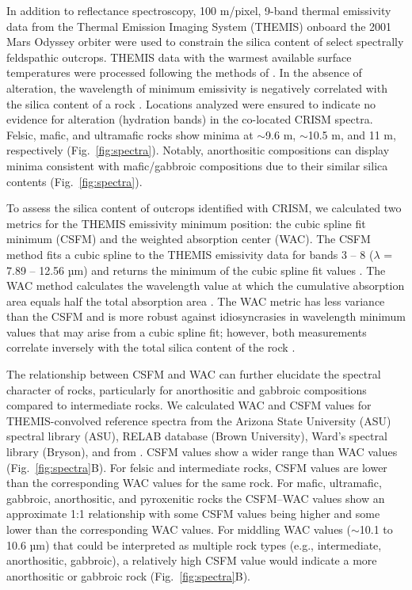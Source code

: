 \documentclass[12pt]{article}
\begin{document}
In addition to reflectance spectroscopy, 100 m/pixel, 9-band thermal emissivity data from the Thermal Emission Imaging System (THEMIS) onboard the 2001 Mars Odyssey orbiter \citep{Christensen2004} were used to constrain the silica content of select spectrally feldspathic outcrops. THEMIS data with the warmest available surface temperatures were processed following the methods of \citet{Bandfield2004}. In the absence of alteration, the wavelength of minimum emissivity is negatively correlated with the silica content of a rock \citep{Lyon1965}. Locations analyzed were ensured to indicate no evidence for alteration (hydration bands) in the co-located CRISM spectra. Felsic, mafic, and ultramafic rocks show minima at $\sim$9.6 \textmu m, $\sim$10.5 \textmu m, and 11 \textmu m, respectively (Fig.~\ref{fig:spectra}). Notably, anorthositic compositions can display minima consistent with mafic/gabbroic compositions due to their similar silica contents (Fig.~\ref{fig:spectra}).

To assess the silica content of outcrops identified with CRISM, we calculated two metrics for the THEMIS emissivity minimum position: the cubic spline fit minimum (CSFM) and the weighted absorption center (WAC). The CSFM method fits a cubic spline to the THEMIS emissivity data for bands 3 -- 8 ($\lambda$ = 7.89 -- 12.56 µm) and returns the minimum of the cubic spline fit values \citep{Rogers2015}. The WAC method calculates the wavelength value at which the cumulative absorption area equals half the total absorption area \citep{Vincent1972, Smith2013, Amador2016}. The WAC metric has less variance than the CSFM and is more robust against idiosyncrasies in wavelength minimum values that may arise from a cubic spline fit; however, both measurements correlate inversely with the total silica content of the rock \citep{Vincent1972, Walter1989, Rogers2015, Amador2016}.

The relationship between CSFM and WAC can further elucidate the spectral character of rocks, particularly for anorthositic and gabbroic compositions compared to intermediate rocks. We calculated WAC and CSFM values for THEMIS-convolved reference spectra from the Arizona State University (ASU) spectral library (ASU), RELAB database (Brown University), Ward's spectral library (Bryson), and from \citet{Dunn2021}. CSFM values show a wider range than WAC values (Fig.~\ref{fig:spectra}B). For felsic and intermediate rocks, CSFM values are lower than the corresponding WAC values for the same rock. For mafic, ultramafic, gabbroic, anorthositic, and pyroxenitic rocks the CSFM--WAC values show an approximate 1:1 relationship with some CSFM values being higher and some lower than the corresponding WAC values. For middling WAC values ($\sim$10.1 to 10.6 µm) that could be interpreted as multiple rock types (e.g., intermediate, anorthositic, gabbroic), a relatively high CSFM value would indicate a more anorthositic or gabbroic rock (Fig.~\ref{fig:spectra}B).
\end{document}
